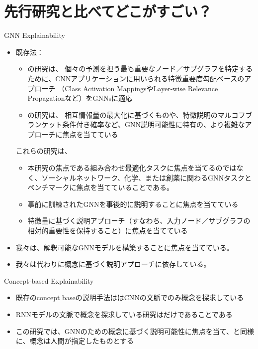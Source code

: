 \documentclass[a4paper,10pt]{ltjsarticle}
\newcommand{\1}{\mbox{1}\hspace{-0.25em}\mbox{l}}
\theoremstyle{definition}
\begin{document}
    \section{先行研究と比べてどこがすごい？}
    GNN Explainability
    \begin{itemize}
        \item 既存法：
        \begin{itemize}
            \item \cite{pope2019explainability, baldassarre2019explainability, schnake2020higher}の研究は、
            個々の予測を担う最も重要なノード／サブグラフを特定するために、CNNアプリケーションに用いられる特徴重要度勾配ベースのアプローチ
            （Class Activation MappingsやLayer-wise Relevance Propagationなど）をGNNsに適応
            \item \cite{ying2019gnnexplainer, vu2020pgm, luo2020parameterized}の研究は、
            相互情報量の最大化に基づくものや、特徴説明のマルコフブランケット条件付き確率など、GNN説明可能性に特有の、より複雑なアプローチに焦点を当てている
        \end{itemize}
        これらの研究は、
        \begin{itemize}
            \item 本研究の焦点である組み合わせ最適化タスクに焦点を当てるのではなく、ソーシャルネットワーク、化学、または創薬に関わるGNNタスクとベンチマークに焦点を当てていることである。
            \item 事前に訓練されたGNNを事後的に説明することに焦点を当てている
            \item 特徴量に基づく説明アプローチ（すなわち、入力ノード／サブグラフの相対的重要性を保持すること）に焦点を当てている
        \end{itemize}
        \item 我々は、解釈可能なGNNモデルを構築することに焦点を当てている。
        \item 我々は代わりに概念に基づく説明アプローチに依存している。
    \end{itemize}

    Concept-based Explainability
    \begin{itemize}
        \item 既存のconcept baseの説明手法ははCNNの文脈でのみ概念を探求している
        \item RNNモデルの文脈で概念を探求している研究は\cite{kazhdan2020meme}だけであることである
        \item この研究では、GNNのための概念に基づく説明可能性に焦点を当て、\cite{koh2020concept}と同様に、概念は人間が指定したものとする
    \end{itemize}
\end{document}
